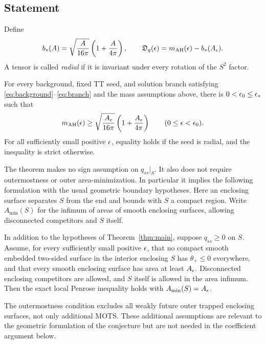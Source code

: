 \subsection{Statement}

Define
\begin{equation}\label{eq:deficit}
 b_*(A)=\sqrt{\frac A{16\pi}}\left(1+\frac A{4\pi}\right),
 \qquad
 \mathfrak D_q(\epsilon)=m_{\mathrm{AH}}(\epsilon)-b_*(A_\epsilon).
\end{equation}
A tensor is called \emph{radial} if it is invariant under every
rotation of the $S^2$ factor.

\begin{theorem}\label{thm:main}
For every background, fixed TT seed, and solution branch satisfying
\eqref{eq:background}--\eqref{eq:branch} and the mass assumptions
above, there is $0<\epsilon_0\leq\epsilon_*$ such that
\[
 m_{\mathrm{AH}}(\epsilon)\geq
 \sqrt{\frac{A_\epsilon}{16\pi}}\left(1+\frac{A_\epsilon}{4\pi}\right)
 \qquad(0\leq\epsilon<\epsilon_0).
\]
For all sufficiently small positive $\epsilon$, equality holds if the
seed is radial, and the inequality is strict otherwise.
\end{theorem}

The theorem makes no sign assumption on $q_{ss}|_S$.
It also does not require outermostness or outer area-minimization.
In particular it implies the following formulation with the usual
geometric boundary hypotheses. Here an enclosing surface separates $S$
from the end and bounds with $S$ a compact region. Write $A_{\min}(S)$
for the infimum of areas of smooth enclosing surfaces, allowing
disconnected competitors and $S$ itself.

\begin{corollary}\label{cor:penrose}
In addition to the hypotheses of Theorem~\ref{thm:main}, suppose
$q_{ss}\geq0$ on $S$. Assume, for every sufficiently small positive
$\epsilon$, that no compact smooth embedded two-sided surface in the
interior enclosing $S$ has $\theta_+\leq0$ everywhere, and that
every smooth enclosing surface has area at least $A_\epsilon$.
Disconnected enclosing competitors are allowed, and $S$ itself is
allowed in the area infimum. Then the exact local Penrose inequality
holds with $A_{\min}(S)=A_\epsilon$.
\end{corollary}

The outermostness condition excludes
all weakly future outer trapped enclosing surfaces, not only
additional MOTS. These additional assumptions are relevant to the
geometric formulation of the conjecture but are not needed in the
coefficient argument below.

